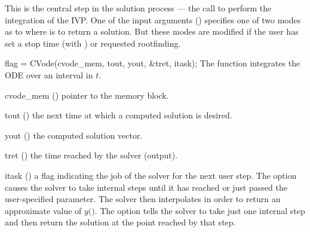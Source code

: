This is the central step in the solution process --- the call to
perform the integration of the IVP.  One of the input arguments ()
specifies one of two modes as to where {\cvodes} is to return a solution.
But these modes are modified if the user has set a stop time (with
) or requested rootfinding.

%
{
  flag = CVode(cvode\_mem, tout, yout, \&tret, itask);
}
{
  The function  integrates the ODE over an interval in $t$.
}
{
  \begin{args}
  \item[cvode\_mem] ()
    pointer to the {\cvodes} memory block.
  \item[tout] ()
    the next time at which a computed solution is desired.
  \item[yout] ()
    the computed solution vector.
  \item[tret] ()
    the time reached by the solver (output).
  \item[itask] ()
    a flag indicating the job of the solver for the next user step. 
    The  option causes the solver to take internal steps until   
    it has reached or just passed the user-specified 
    parameter. The solver then interpolates in order to   
    return an approximate value of $y($$)$. 
    The  option tells the solver to take just one internal step  
    and then return the solution at the point reached by that step. 
  \end{args}
}
